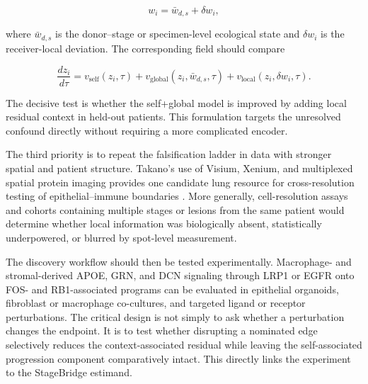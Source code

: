 \begin{equation}
  w_i = \bar{w}_{d,s} + \delta w_i,
\end{equation}

where $\bar{w}_{d,s}$ is the donor--stage or specimen-level ecological state and $\delta w_i$ is the receiver-local deviation. The corresponding field should compare

\begin{equation}
\frac{dz_i}{d\tau}
=
 v_{\mathrm{self}}(z_i,\tau)
 + v_{\mathrm{global}}(z_i,\bar w_{d,s},\tau)
 + v_{\mathrm{local}}(z_i,\delta w_i,\tau).
\end{equation}

The decisive test is whether the self+global model is improved by adding local residual context in held-out patients. This formulation targets the unresolved confound directly without requiring a more complicated encoder.

The third priority is to repeat the falsification ladder in data with stronger spatial and patient structure. Takano's use of Visium, Xenium, and multiplexed spatial protein imaging provides one candidate lung resource for cross-resolution testing of epithelial--immune boundaries \autocite{Takano2024-ys}. More generally, cell-resolution assays and cohorts containing multiple stages or lesions from the same patient would determine whether local information was biologically absent, statistically underpowered, or blurred by spot-level measurement.

The discovery workflow should then be tested experimentally. Macrophage- and stromal-derived APOE, GRN, and DCN signaling through LRP1 or EGFR onto FOS- and RB1-associated programs can be evaluated in epithelial organoids, fibroblast or macrophage co-cultures, and targeted ligand or receptor perturbations. The critical design is not simply to ask whether a perturbation changes the endpoint. It is to test whether disrupting a nominated edge selectively reduces the context-associated residual while leaving the self-associated progression component comparatively intact. This directly links the experiment to the StageBridge estimand.

